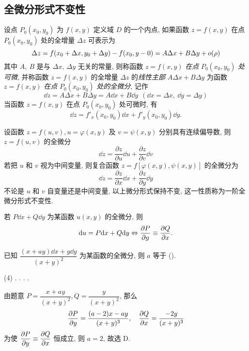 \subsection{全微分形式不变性}

\begin{definition}[全微分的定义]
    设点 $P_0(x_0,y_0)$ 为 $f(x,y)$ 定义域 $D$ 的一个内点, 如果函数 $z=f(x,y)$ 在点 $P_0(x_0,y_0)$ 处的全增量 $\Delta z$ 可表示为
    $$\Delta z=f(x_0+\Delta x,y_0+\Delta y)-f(x_0,y-0)=A\Delta x+B\Delta y+o\qty(\rho)$$
    其中 $A,~B$ 是与 $\Delta x,~\Delta y$ 无关的常量, 则称函数 $z=f(x,y)$ \textit{在点} $P_0(x_0,y_0)$ \textit{处可微}, 并称函数
    $z=f(x,y)$ 的全增量 $\Delta z$ 的\textit{线性主部} $A\Delta x+B\Delta y$ 为函数 $z=f(x,y)$ \textit{在点} $P_0(x_0,y_0)$ \textit{处的全微分}, 记作
    $$\dd z=A\Delta x+B\Delta y=A\dd x+B\dd y~~(\dd x=\Delta x,~\dd y=\Delta y)$$
    当函数 $z=f(x,y)$ 在点 $P_0(x_0,y_0)$ 处可微时, 有 $$\dd z=f'_x(x_0,y_0)\dd x+f'_y(x_0,y_0)\dd y.$$
\end{definition}

\begin{theorem}[全微分的形式不变性]
    设函数 $ z=f(u, v), u=\varphi(x, y) $ 及 $ v=\psi(x, y) $ 分别具有连续偏导数, 则 $ z=f(u, v) $ 的全微分
    $$\dd  z=\frac{\partial z}{\partial u} \dd  u+\frac{\partial z}{\partial v} \dd  v$$
    若把 $ u $ 和 $ v $ 视为中间变量, 则复合函数 $ z=f[\varphi(x, y), \psi(x, y)] $ 的全微分为
    $$\dd  z=\frac{\partial z}{\partial x} \dd  x+\frac{\partial z}{\partial y} \dd  y$$
    不论是 $ u $ 和 $ v $ 自变量还是中间变量, 以上微分形式保持不变, 这一性质称为一阶全微分形式不变性.
\end{theorem}

\begin{theorem}
    若 $P \dd x+Q \dd y$ 为某函数 $u(x,y)$ 的全微分, 则 
    $$
    \dd u= P\dd x+Q\dd y\Leftrightarrow \pdv{P}{y}\equiv\pdv{Q}{x}.
    $$
\end{theorem}

\begin{example}
    已知 $\dfrac{(x+ay)\dd x+y\dd y}{(x+y)^2}$ 为某函数的全微分, 则 $a$ 等于 (\quad).
    \begin{tasks}(4)
        .
        .
        .
        .
    \end{tasks}
\end{example}
\begin{solution}
    由题意 $P=\dfrac{x+ay}{(x+y)^2},Q=\dfrac{y}{(x+y)^2}$, 那么 $$
    \pdv{P}{y}=\dfrac{(a-2)x-ay}{(x+y)^3},\quad \pdv{Q}{x}=\dfrac{-2y}{(x+y)^3}
    $$
    为使 $ \displaystyle \pdv{P}{y}\equiv\pdv{Q}{x} $ 恒成立, 则 $a=2$, 故选 D.
\end{solution}

